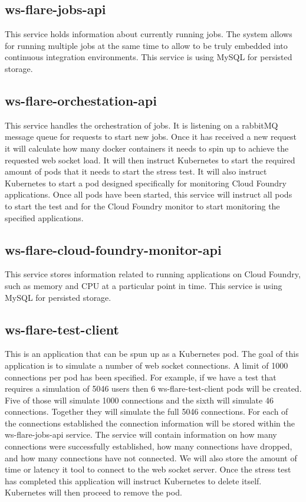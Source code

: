 \subsection{ws-flare-jobs-api}

This service holds information about currently running jobs. The system allows for running multiple jobs at the same time to allow to be truly embedded into continuous integration environments. This service is using MySQL for persisted storage. 

\subsection{ws-flare-orchestation-api}

This service handles the orchestration of jobs. It is listening on a rabbitMQ message queue for requests to start new jobs. Once it has received a new request it will calculate how many docker containers it needs to spin up to achieve the requested web socket load. It will then instruct Kubernetes to start the required amount of pods that it needs to start the stress test. It will also instruct Kubernetes to start a pod designed specifically for monitoring Cloud Foundry applications. Once all pods have been started, this service will instruct all pods to start the test and for the Cloud Foundry monitor to start monitoring the specified applications.

\subsection{ws-flare-cloud-foundry-monitor-api}

This service stores information related to running applications on Cloud Foundry, such as memory and CPU at a particular point in time. This service is using MySQL for persisted storage. 

\subsection{ws-flare-test-client}

This is an application that can be spun up as a Kubernetes pod. The goal of this application is to simulate a number of web socket connections. A limit of 1000 connections per pod has been specified. For example, if we have a test that requires a simulation of 5046 users then 6 ws-flare-test-client pods will be created. Five of those will simulate 1000 connections and the sixth will simulate 46 connections. Together they will simulate the full 5046 connections. For each of the connections established the connection information will be stored within the ws-flare-jobs-api service. The service will contain information on how many connections were successfully established, how many connections have dropped, and how many connections have not connected. We will also store the amount of time or latency it tool to connect to the web socket server. Once the stress test has completed this application will instruct Kubernetes to delete itself. Kubernetes will then proceed to remove the pod.

